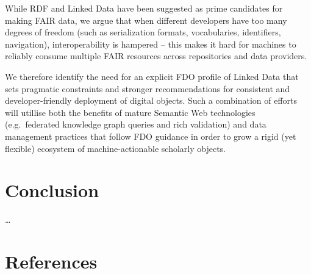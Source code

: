 While RDF and Linked Data have been suggested as prime candidates for making FAIR data, we argue that when different developers have too many degrees of freedom (such as serialization formats, vocabularies, identifiers, navigation), interoperability is hampered -- this makes it hard for machines to reliably consume multiple FAIR resources across repositories and data providers.

We therefore identify the need for an explicit FDO profile of Linked Data that sets pragmatic constraints and stronger recommendations for consistent and developer-friendly deployment of digital objects.
Such a combination of efforts will utillise both the benefits of mature Semantic Web technologies (e.g.~federated knowledge graph queries and rich validation) and data management practices that follow FDO guidance in order to grow a rigid (yet flexible) ecosystem of machine-actionable scholarly objects.

\hypertarget{conclusion}{%
\section{Conclusion}\label{conclusion}}

\ldots{}

\hypertarget{references}{%
\section{References}\label{references}}

